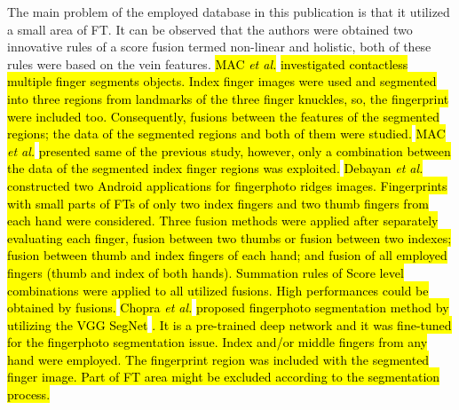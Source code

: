 \documentclass[review]{elsarticle}
\begin{document}
	The main problem of the employed database in this publication is that it utilized a small area of FT. It can be observed that the authors were obtained two innovative rules of a score fusion termed non-linear and holistic, both of these rules were based on the vein features. \hl{MAC \textit{et al.}} \cite{MAC2018contactless} \hl{investigated contactless multiple finger segments objects. Index finger images were used and segmented into three regions from landmarks of the three finger knuckles, so, the fingerprint were included too. Consequently, fusions between the features of the segmented regions; the data of the segmented regions and both of them were studied.} \hl{MAC \textit{et al.}} \cite{Jahan2018Contactless} \hl{presented same of the previous study, however, only a combination between the data of the segmented index finger regions was exploited.}
	\hl{Debayan \textit{et al.}} \cite{Debayan2018matching} \hl{constructed two Android applications for fingerphoto ridges images. Fingerprints with small parts of FTs of only two index fingers and two thumb fingers from each hand were considered.	Three fusion methods were applied after separately evaluating each finger, fusion between two thumbs or fusion between two indexes; fusion between thumb and index fingers of each hand; and fusion of all employed fingers (thumb and index of both hands). Summation rules of Score level combinations were applied to all utilized fusions. High performances could be obtained by fusions.} \hl{Chopra \textit{et al.}} \cite{Chopra2018Unconstrained} \hl{proposed fingerphoto segmentation method by utilizing the VGG SegNet} \cite{Badrinarayanan2017SegNet}\hl{. It is a pre-trained deep network and it was fine-tuned for the fingerphoto segmentation issue. Index and/or middle fingers from any hand were employed. The fingerprint region was included with the segmented finger image. Part of FT area might be excluded according to the segmentation process. }
\end{document}
